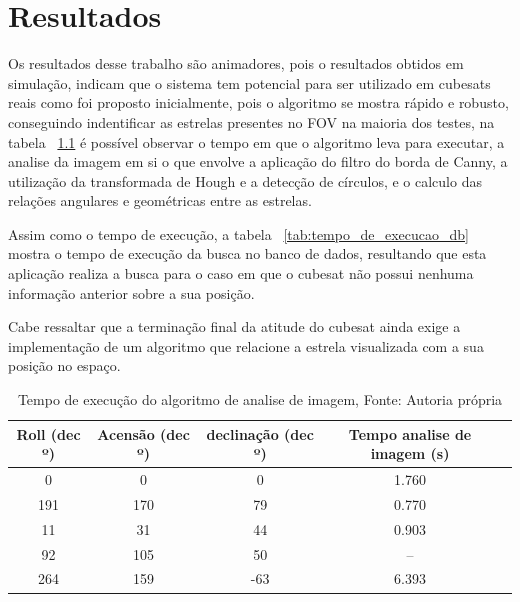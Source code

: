 \chapter{Resultados}

Os resultados desse trabalho são animadores, pois o resultados obtidos em simulação,
indicam que o sistema tem potencial para ser utilizado em cubesats reais como foi proposto inicialmente,
pois o algoritmo se mostra rápido e robusto, conseguindo indentificar as estrelas presentes no FOV na maioria dos testes,
na tabela ~\ref{tab:tempo_de_execucao_img} é possível observar o tempo em que o algoritmo leva para executar,
a analise da imagem em si o que envolve a aplicação do filtro do borda de Canny, a utilização da transformada de Hough e a detecção de círculos,
e o calculo das relações angulares e geométricas entre as estrelas.

Assim como o tempo de execução, a tabela ~\ref{tab:tempo_de_execucao_db} mostra o tempo de execução da busca no banco de dados,
resultando que esta aplicação realiza a busca para o caso em que o cubesat não possui nenhuma informação anterior sobre a sua posição.

Cabe ressaltar que a terminação final da atitude do cubesat ainda exige a implementação de um algoritmo que relacione a estrela visualizada com a sua posição no espaço.

\begin{table}[ht]
    \centering

    \begin{tabular}{|c|c|c|c|c|}
        \hline
        \textbf{Roll (dec º)} & \textbf{Acensão (dec º)} & \textbf{declinação (dec º)} & \textbf{Tempo analise de imagem (s)} \\ \hline
        0                     & 0                        & 0                           & 1.760                                \\ \hline
        191                   & 170                      & 79                          & 0.770                                \\ \hline
        11                    & 31                       & 44                          & 0.903                                \\ \hline
        92                    & 105                      & 50                          & --                                   \\ \hline
        264                   & 159                      & -63                         & 6.393                                \\ \hline
    \end{tabular}
    \caption{Tempo de execução do algoritmo de analise de imagem, Fonte: Autoria própria}
    \label{tab:tempo_de_execucao_img}
\end{table}

